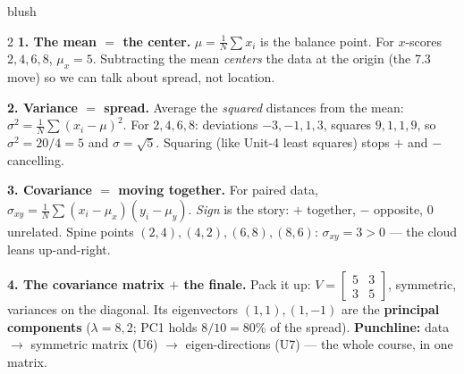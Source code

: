 \documentclass[10pt]{article}
\begin{document}
\begin{skillbox}[Lesson]{blush}
\begin{multicols}{2}
\textbf{1. The mean $=$ the center.} $\mu=\frac1N\sum x_i$ is the balance point. For $x$-scores $2,4,6,8$,
$\mu_x=5$. Subtracting the mean \emph{centers} the data at the origin (the 7.3 move) so we can talk about spread,
not location.

\textbf{2. Variance $=$ spread.} Average the \emph{squared} distances from the mean:
$\sigma^2=\frac1N\sum(x_i-\mu)^2$. For $2,4,6,8$: deviations $-3,-1,1,3$, squares $9,1,1,9$, so
$\sigma^2=20/4=5$ and $\sigma=\sqrt5$. Squaring (like Unit-4 least squares) stops $+$ and $-$ cancelling.

\columnbreak

\textbf{3. Covariance $=$ moving together.} For paired data,
$\sigma_{xy}=\frac1N\sum(x_i-\mu_x)(y_i-\mu_y)$. \emph{Sign} is the story: $+$ together, $-$ opposite, $0$
unrelated. Spine points $(2,4),(4,2),(6,8),(8,6)$: $\sigma_{xy}=3>0$ --- the cloud leans up-and-right.

\textbf{4. The covariance matrix $+$ the finale.} Pack it up: $V=\left[\begin{smallmatrix}5&3\\3&5\end{smallmatrix}\right]$,
symmetric, variances on the diagonal. Its eigenvectors $(1,1),(1,-1)$ are the \textbf{principal components}
($\lambda=8,2$; PC1 holds $8/10=80\%$ of the spread). \textbf{Punchline:} data $\to$ symmetric matrix (U6) $\to$
eigen-directions (U7) --- the whole course, in one matrix.
\end{multicols}
\end{skillbox}
\end{document}
